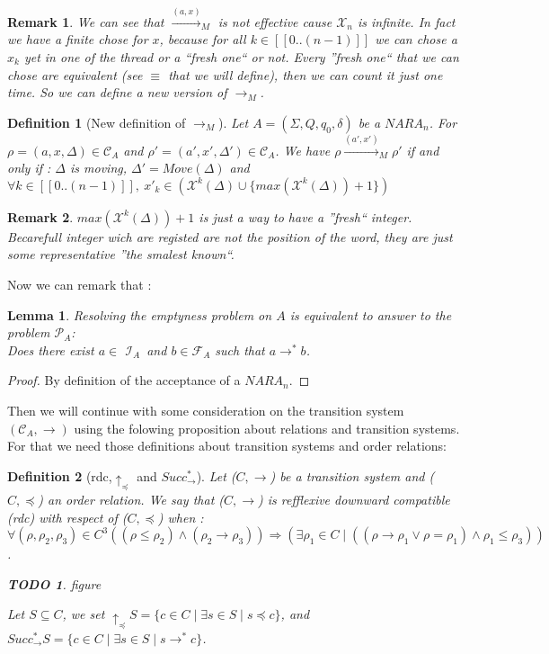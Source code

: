 \documentclass[a4paper,10pt]{report}
\newtheorem{lm}{Lemma}[thr]
\newtheorem{df}{Definition}
\newtheorem{rk}{Remark}
\newtheorem{td}{TODO}
\newcommand{\seg}[1]{[\![#1]\!]}
\newcommand{\ts}{\seg{0 .. (n-1)}}
\newcommand{\C}{\mathcal{C}_{A}}
\newcommand{\I}{\mathcal{I}_{A}}
\newcommand{\F}{\mathcal{F}_{A}}
\newcommand{\Xa}{\mathcal{X}}
\newcommand{\X}{\mathcal{X}_{n}}
\newcommand{\pb}{$\mathcal{P}_{A}$}
\begin{document}
\begin{rk}
  We can see that ${\xrightarrow{(a,x)}}_M$ is not effective cause $\X$ is infinite.
  In fact we have a finite chose for $x$, because for all $ k \in \ts$ we can chose a $x_k$ yet in one of the thread or a ``fresh one`` or not.
  Every ''fresh one`` that we can chose are equivalent (see $\equiv$ that we will define), then we can count it just one time.
  So we can define a new version of ${\xrightarrow{}}_M$. 
\end{rk}

\begin{df}[New definition of $\rightarrow_M$]
  \label{minipb}
  Let $A = (\Sigma ,Q ,q_0, \delta )$ be a $NARA_n$.
  For $\rho = (a,x,\Delta) \in \C$ and $\rho' = (a',x',\Delta') \in \C$.
  We have $\rho {\xrightarrow{(a',x')}}_M \rho'$ if and only if :
  $\Delta$ is moving, $\Delta' = Move(\Delta)$ and $\forall k \in \ts,\ x'_k \in (\Xa^k(\Delta) \cup \{max(\Xa^k(\Delta))+1\}) $  
\end{df}

\begin{rk}
 $max(\Xa^k(\Delta))+1$ is just a way to have a ''fresh`` integer.
 Becarefull integer wich are registed are not the position of the word, they are just some representative ''the smalest known``.  
\end{rk}


Now we can remark that :
\begin{lm}
  \label{lmtth}
  Resolving the emptyness problem on $A$ is equivalent to answer to the problem \pb: \\
  Does there exist $a \in$ $\I$\ and $b \in\F$ such that $ a \rightarrow^* b $. 
\end{lm}
\begin{proof} 
  By definition of the acceptance of a $NARA_n$. 
\end{proof}

Then we will continue with some consideration on the transition system $(\C,\rightarrow)$ using the folowing proposition about relations and transition systems.
For that we need those definitions about transition systems and order relations:

\begin{df}[rdc,$\uparrow_\preceq$ and $ Succ^*_\rightarrow$]
  Let ($C,\rightarrow$) be a transition system and ($C,\preceq$) an order relation.
  We say that ($C,\rightarrow$) is refflexive downward compatible (rdc) with respect of ($C,\preceq$) when :
 $$\forall (\rho,\rho_2,\rho_3) \in C^3  ((\rho \leq \rho_2) \wedge (\rho_2 \rightarrow \rho_3)) \Rightarrow (\exists \rho_1 \in C \mid ((\rho \rightarrow \rho_1 \vee \rho = \rho_1) \wedge \rho_1 \leq \rho_3))$$. 
 \begin{td}
  figure
 \end{td}

  Let $S \subseteq C$,
  we set $\uparrow_\preceq S = \{c \in C \mid \exists s \in S \mid s \preceq c \}$, and $Succ^*_\rightarrow S = \{c \in C \mid \exists s \in S \mid s \rightarrow^* c \}$.
\end{df}
\end{document}
